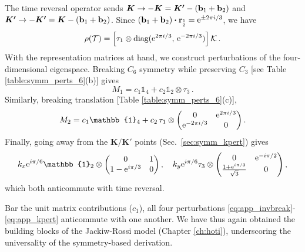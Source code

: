 %
The time reversal operator sends $\boldsymbol{K}  \rightarrow -\boldsymbol{K} = \boldsymbol{K'} - ( \vb{b}_1 + \vb{b}_2)$ and $\boldsymbol{K'}  \rightarrow -\boldsymbol{K'} = \boldsymbol{K} - (\vb{b}_1 + \vb{b}_2)$. Since $(\vb{b}_1 + \vb{b}_2) \vdot  \vb{r}_{_{2}^{1}} = \e^{\pm 2 \pi i / 3}$, we have
\begin{equation}
\rho(\mathcal{T}) = \left[\tau_1 \otimes \text{diag} (  {\rm e}^{2 \pi i /3} , \, {\rm e}^{-2 \pi i /3} ) \right] \mathcal{K} \,.
\end{equation}
%
With the representation matrices at hand, we construct perturbations of the four-dimensional eigenspace. Breaking $C_6$ symmetry while preserving $C_3$ [see Table \ref{table:symm_perts_6}(b)] gives
\begin{equation} \label{eq:app_invbreak}
M_1 = c_1 \mathbb{1}_4 + c_2 \mathbb{1}_2 \otimes \tau_3 \,.
\end{equation}
%
Similarly, breaking translation [Table \ref{table:symm_perts_6}(c)],
\begin{equation}
M_2 = c_1 \mathbb{1}_4 + c_2 \, \tau_1 \otimes \mqty(0 & \e^{2 \pi i /3} \\ \e^{-2\pi i / 3} & 0) \,.
\end{equation}
Finally, going away from the $\boldsymbol{K} / \boldsymbol{K'}$ points (Sec.~\ref{sec:symm_kpert}) gives
\begin{equation} \label{eq:app_kpert}
k_x \e^{i \pi / 6} \mathbb{1}_2 \otimes \mqty(0 & 1 \\ 1 - \e^{i \pi / 3}  & 0) \,, \quad k_y \e^{i \pi / 6} \tau_3 \otimes \mqty(0 & \e^{-i \pi/2} \\ \frac{1+\e^{i \pi /3}}{\sqrt{3}} & 0) \,,
\end{equation}
which both anticommute with time reversal. 

Bar the unit matrix contributions ($c_1$), all four perturbations \eqref{eq:app_invbreak}-\eqref{eq:app_kpert} anticommute with one another. We have thus again obtained the building blocks of the Jackiw-Rossi model (Chapter \ref{ch:hoti}), underscoring the universality of the symmetry-based derivation. 